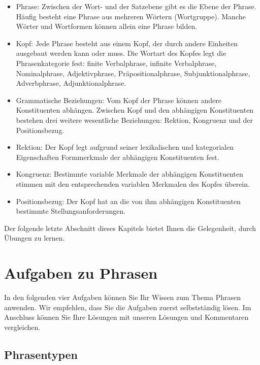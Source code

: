 \begin{itemize}

\item Phrase: Zwischen der Wort- und der Satzebene gibt es die Ebene der Phrase. Häufig besteht eine Phrase aus mehreren Wörtern (Wortgruppe). Manche Wörter und Wortformen können allein eine Phrase bilden. 

\item Kopf: Jede Phrase besteht aus einem Kopf, der durch andere Einheiten ausgebaut werden kann oder muss. Die Wortart des Kopfes legt die Phrasenkategorie fest: finite Verbalphrase, infinite Verbalphrase, Nominalphrase, Adjektivphrase, Präpositionalphrase, Subjunktionalphrase, Adverbphrase, Adjunktionalphrase. 

\item Grammatische Beziehungen: Vom Kopf der Phrase können andere Konstituenten abhängen. Zwischen Kopf und den abhängigen Konstituenten bestehen drei weitere wesentliche Beziehungen: Rektion, Kongruenz und der Positionsbezug.

\item Rektion: Der Kopf legt aufgrund seiner lexikalischen und kategorialen Eigenschaften Formmerkmale der abhängigen Konstituenten fest.

\item Kongruenz: Bestimmte variable Merkmale der abhängigen Konstituenten stimmen mit den entsprechenden variablen Merkmalen des Kopfes überein.

\item Positionsbezug: Der Kopf hat an die von ihm abhängigen Konstituenten bestimmte Stellungsanforderungen.  

\end{itemize}

Der folgende letzte Abschnitt dieses Kapitels bietet Ihnen die Gelegenheit, durch Übungen zu lernen.

\section{Aufgaben zu Phrasen}\label{section:Aufgaben_Phrasen}

In den folgenden vier Aufgaben können Sie Ihr Wissen zum Thema Phrasen anwenden. Wir empfehlen, dass Sie die Aufgaben zuerst selbstständig lösen. Im Anschluss können Sie Ihre Lösungen mit unseren Lösungen und Kommentaren vergleichen.


\subsection{Phrasentypen}\label{subsection:A_Phrasentypen}

